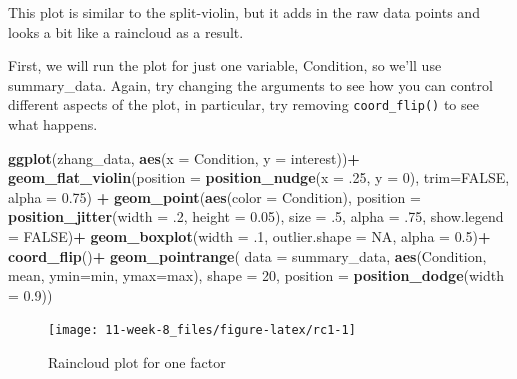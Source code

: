 \documentclass[]{book}
\newenvironment{Shaded}{\begin{snugshade}}{\end{snugshade}}
\newcommand{\DataTypeTok}[1]{\textcolor[rgb]{0.13,0.29,0.53}{#1}}
\newcommand{\DecValTok}[1]{\textcolor[rgb]{0.00,0.00,0.81}{#1}}
\newcommand{\FloatTok}[1]{\textcolor[rgb]{0.00,0.00,0.81}{#1}}
\newcommand{\KeywordTok}[1]{\textcolor[rgb]{0.13,0.29,0.53}{\textbf{#1}}}
\newcommand{\NormalTok}[1]{#1}
\newcommand{\OperatorTok}[1]{\textcolor[rgb]{0.81,0.36,0.00}{\textbf{#1}}}
\newcommand{\OtherTok}[1]{\textcolor[rgb]{0.56,0.35,0.01}{#1}}
\newcommand{\StringTok}[1]{\textcolor[rgb]{0.31,0.60,0.02}{#1}}
\begin{document}
This plot is similar to the split-violin, but it adds in the raw data points and looks a bit like a raincloud as a result.

First, we will run the plot for just one variable, Condition, so we'll use summary\_data. Again, try changing the arguments to see how you can control different aspects of the plot, in particular, try removing \texttt{coord\_flip()} to see what happens.

\begin{Shaded}
\begin{Highlighting}[]
\KeywordTok{ggplot}\NormalTok{(zhang_data, }\KeywordTok{aes}\NormalTok{(}\DataTypeTok{x =}\NormalTok{ Condition, }\DataTypeTok{y =}\NormalTok{ interest))}\OperatorTok{+}
\StringTok{  }\KeywordTok{geom_flat_violin}\NormalTok{(}\DataTypeTok{position =} \KeywordTok{position_nudge}\NormalTok{(}\DataTypeTok{x =} \FloatTok{.25}\NormalTok{, }\DataTypeTok{y =} \DecValTok{0}\NormalTok{), }
                   \DataTypeTok{trim=}\OtherTok{FALSE}\NormalTok{, }\DataTypeTok{alpha =} \FloatTok{0.75}\NormalTok{) }\OperatorTok{+}
\StringTok{  }\KeywordTok{geom_point}\NormalTok{(}\KeywordTok{aes}\NormalTok{(}\DataTypeTok{color =}\NormalTok{ Condition), }
             \DataTypeTok{position =} \KeywordTok{position_jitter}\NormalTok{(}\DataTypeTok{width =} \FloatTok{.2}\NormalTok{, }\DataTypeTok{height =} \FloatTok{0.05}\NormalTok{), }
             \DataTypeTok{size =} \FloatTok{.5}\NormalTok{, }\DataTypeTok{alpha =} \FloatTok{.75}\NormalTok{, }\DataTypeTok{show.legend =} \OtherTok{FALSE}\NormalTok{)}\OperatorTok{+}
\StringTok{  }\KeywordTok{geom_boxplot}\NormalTok{(}\DataTypeTok{width =} \FloatTok{.1}\NormalTok{, }\DataTypeTok{outlier.shape =} \OtherTok{NA}\NormalTok{, }\DataTypeTok{alpha =} \FloatTok{0.5}\NormalTok{)}\OperatorTok{+}
\StringTok{  }\KeywordTok{coord_flip}\NormalTok{()}\OperatorTok{+}
\StringTok{  }\KeywordTok{geom_pointrange}\NormalTok{(}
    \DataTypeTok{data =}\NormalTok{ summary_data,}
    \KeywordTok{aes}\NormalTok{(Condition, mean, }\DataTypeTok{ymin=}\NormalTok{min, }\DataTypeTok{ymax=}\NormalTok{max),}
    \DataTypeTok{shape =} \DecValTok{20}\NormalTok{, }
    \DataTypeTok{position =} \KeywordTok{position_dodge}\NormalTok{(}\DataTypeTok{width =} \FloatTok{0.9}\NormalTok{))}
\end{Highlighting}
\end{Shaded}

\begin{figure}

{\centering \texttt{[image: 11-week-8\_files/figure-latex/rc1-1]} 

}

\caption{Raincloud plot for one factor}\label{fig:rc1}
\end{figure}
\end{document}
